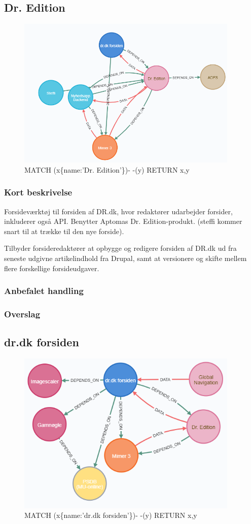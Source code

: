 \documentclass{article}
\begin{document}
\subsection{Dr. Edition}
\begin{figure}[h]
\includegraphics[width=300pt]{DrEdition.PNG}
\caption{MATCH (x\{name:'Dr. Edition'\})- -(y) RETURN x,y}
\end{figure}
\subsubsection{Kort beskrivelse}
Forsideværktøj til forsiden af DR.dk, hvor redaktører udarbejder forsider, inkluderer også API. Benytter Aptomas Dr. Edition-produkt. (steffi kommer snart til at trække til den nye forside). 

Tilbyder forsideredaktører at opbygge og redigere forsiden af DR.dk ud fra seneste udgivne artikelindhold fra Drupal, samt at versionere og skifte mellem flere forskellige forsideudgaver.
\subsubsection{Anbefalet handling}
\subsubsection{Overslag}


\subsection{dr.dk forsiden}
\begin{figure}[h]
\includegraphics[width=300pt]{DrDkForsiden.PNG}
\caption{MATCH (x\{name:'dr.dk forsiden'\})- -(y) RETURN x,y}
\end{figure}
\end{document}
